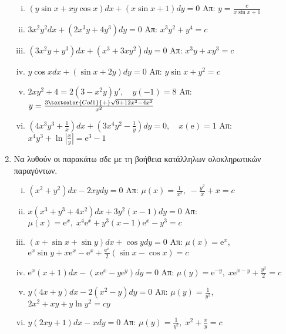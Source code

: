 \begin{enumerate}
    \begin{enumerate}[i)]
      \item $ (y \sin{x} + xy \cos{x})dx + (x \sin{x} +1) dy=0 $ %
        \hfill Απ: $ y= \frac{c}{x \sin{x} +1} $ 
      \item $ 3x^{2}y^{2}dx+(2x^{3}y+4y^{3})dy=0$  %
        \hfill Απ: $ x^{3}y^{2}+y^{4}=c $
      \item $ (3x^{2}y+y^{3})dx+(x^{3}+3xy^{2})dy=0 $ %
        \hfill Απ: $ x^{3}y+xy^{3}=c $
      \item $ y \cos{x} dx + (\sin{x} + 2y)dy=0 $ %
        \hfill Απ: $ y \sin{x} + y^{2}=c $ 
      \item $ 2xy^{2}+4 = 2(3-x^{2}y)y', \quad y(-1)=8 $ %
        \hfill Απ: $ y= \frac{3 \textcolor{Col1}{+} \sqrt{9+12x^{2}-4x^{3}}}{x^{2}} $ 
      \item $(4x^3y^3+\frac{1}{x})dx+(3x^4y^2-\frac{1}{y})dy=0, \quad x(\mathrm{e})=1$
        \hfill Απ: $x^4y^3+\ln |\frac{x}{y}|= \mathrm{e}^3-1$
    \end{enumerate}

\item Να λυθούν οι παρακάτω σδε με τη βοήθεια κατάλληλων ολοκληρωτικών παραγόντων.
	
  \begin{enumerate}[i)]
    \item $ (x^{2}+y^{2})dx - 2xydy = 0 $   
      \hfill Απ: $ \mu(x)= \frac{1}{x^{2}}, \; - \frac{y^{2}}{x} + x = c $
    \item $ x(x^{3}+y^{3}+4x^{2})dx+ 3y^{2}(x-1)dy=0 $ %
      \hfill Απ: $ \mu (x)= \mathrm{e}^{x}, \; x^{4} \mathrm{e}^{x} + y^{3}(x-1)
      \mathrm{e}^{x} - y^{3}=c $ 
    \item $ (x+ \sin{x} + \sin{y} )dx + \cos{y} dy=0 $ %
      \hfill Απ: $ \mu (x) = \mathrm{e}^{x} $, \; $ \mathrm{e}^{x} \sin{y} + x
      \mathrm{e}^{x} - \mathrm{e}^{x} + \frac{\mathrm{e}^{x}}{2} (\sin{x} - \cos{x})=c$
    \item $ \mathrm{e}^{x}(x+1)dx - (x \mathrm{e}^{x}-y \mathrm{e}^{y})dy = 0 $ 
      \hfill Απ: $ \mu(y) = \mathrm{e}^{-y}, \; x\mathrm{e}^{x-y} +\frac{y^{2}}{2}=c$
    \item $ y(4x+y)dx-2(x^{2}-y)dy=0 $ %
      \hfill Απ: $ \mu (y) = \frac{1}{y^{2}} $, \; $ 2x^{2}+xy+y \ln{y^{2}} = cy $  
    \item $ y(2xy+1)dx-xdy=0 $ %
      \hfill Απ: $ \mu (y) = \frac{1}{y^{2}}, \; x^{2} + \frac{x}{y} = c $ 
  \end{enumerate}


\end{enumerate}
